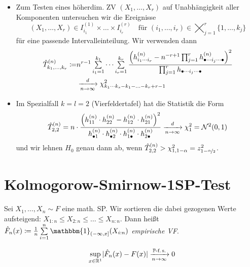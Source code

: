 \documentclass{cheat-sheet}
\renewcommand{\P}{\mathbb{P}} %
\newcommand{\ind}{\mathbbm{1}} %
\newcommand{\Normal}{\mathcal{N}} %
\begin{document}
\begin{bemn}
  \begin{itemize}
    \item Zum Testen eines höherdim. ZV $(X_1, \ldots, X_r)$ auf Unabhängigkeit aller Komponenten untersuchen wir die Ereignisse
    \[
      (X_1, \ldots, X_r) \in I_{i_1}^{(1)} \times \ldots \times I_{i_r}^{(r)} \quad
      \text{für $(i_1, \ldots, i_r) \in \bigtimes_{j=1}^r \{ 1, \ldots, k_j \}$}
    \]
    für eine passende Intervalleinteilung.
    Wir verwenden dann
    \begin{align*}
      \hat{T}_{k_1, \ldots, k_r}^{(n)} \coloneqq
      & n^{r-1} \sum_{i_1=1}^{k_1} \cdots \sum_{i_r=1}^{k_r} \frac{\left(h_{i_1 \cdots i_r}^{(n)} - n^{-r + 1} \prod_{j=1}^r h_{\bullet \cdots i_j \cdots \bullet}^{(n)}\right)^2}{\prod_{j=1}^r h_{\bullet \cdots i_j \cdots \bullet}} \\
      & \xra[n \to \infty]{d} \chi^2_{k_1 \cdots k_s - k_1 - \ldots - k_r + r - 1}
    \end{align*}
    \item Im Spezialfall $k \!=\! l \!=\! 2$ (Vierfeldertafel) hat die Statistik die Form
    \[
      \hat{T}_{2,2}^{(n)} =
      n \cdot \frac{\left(h_{11}^{(n)} \cdot h_{22}^{(n)} - h_{12}^{(n)} \cdot h_{21}^{(n)}\right)^2}{h_{\bullet 1}^{(n)} \cdot h_{\bullet 2}^{(n)} \cdot h_{1 \bullet}^{(n)} \cdot h_{2 \bullet}^{(n)}}
      \xra[n \to \infty]{d} \chi^2_1 = \Normal^2(0, 1)
    \]
    und wir lehnen $H_0$ genau dann ab, wenn $\hat{T}_{2,2}^{(n)} > \chi^2_{1,1-\alpha} = z^2_{1 - \nicefrac{\alpha}{2}}$.
  \end{itemize}
\end{bemn}

\section{Kolmogorow-Smirnow-1SP-Test}

\begin{situation}
  Sei $X_1, \ldots, X_n \sim F$ eine math. SP.
  Wir sortieren die dabei gezogenen Werte aufsteigend: $X_{1:n} \leq X_{2:n} \leq \ldots \leq X_{n:n}$.
  Dann heißt $\hat{F}_n(x) \coloneqq \tfrac{1}{n} \sum_{i=1}^n \ind_{\ocinterval{-\infty}{x}}(X_{i:n})$ \emph{empirische VF}.
\end{situation}

\begin{satz}
  \[ \sup_{x \in \R^1} \abs{\hat{F}_n(x) - F(x)} \xra[n \to \infty]{\text{$\P$-f.\,s.}} 0 \]
\end{satz}
\end{document}
